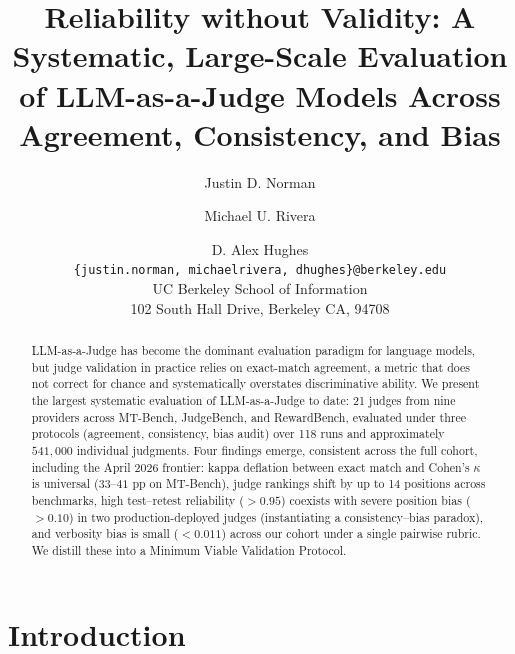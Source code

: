 \documentclass[11pt]{article}
\title{Reliability without Validity: A Systematic, Large-Scale Evaluation\\of LLM-as-a-Judge Models Across Agreement, Consistency, and Bias}
\author{
  Justin D. Norman \and Michael U. Rivera \and D. Alex Hughes \\ 
  \texttt{\{justin.norman, michaelrivera, dhughes\}@berkeley.edu} \\ 
  UC Berkeley School of Information \\ 
  102 South Hall Drive, Berkeley CA, 94708
  }
\begin{document}
\nolinenumbers
\raggedbottom
\maketitle

\begin{abstract}
LLM-as-a-Judge has become the dominant evaluation paradigm for language models, but judge validation in practice relies on exact-match agreement, a metric that does not correct for chance and systematically overstates discriminative ability. We present the largest systematic evaluation of LLM-as-a-Judge to date: 21 judges from nine providers across MT-Bench, JudgeBench, and RewardBench, evaluated under three protocols (agreement, consistency, bias audit) over 118 runs and approximately $541{,}000$ individual judgments. Four findings emerge, consistent across the full cohort, including the April 2026 frontier: kappa deflation between exact match and Cohen's $\kappa$ is universal ($33$--$41$ pp on MT-Bench), judge rankings shift by up to 14 positions across benchmarks, high test--retest reliability ($>0.95$) coexists with severe position bias ($>0.10$) in two production-deployed judges (instantiating a consistency--bias paradox), and verbosity bias is small ($<0.011$) across our cohort under a single pairwise rubric. We distill these into a Minimum Viable Validation Protocol.
\end{abstract}


\section{Introduction}

\end{document}
